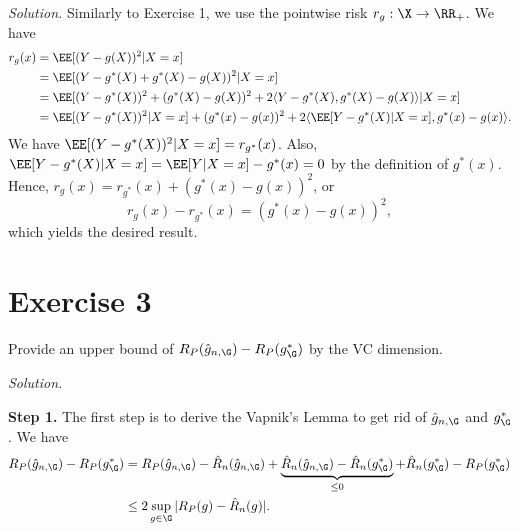 \textit{Solution.} Similarly to Exercise 1, we use the pointwise risk $r_g:\X\to \RR_+$. We have
\begin{align*}
  r_g(x) & = \EE[(Y-g(X))^2 | X=x]                                                                    \\
         & = \EE[(Y-g^*(X)+g^*(X)-g(X))^2 | X=x]                                                      \\
         & = \EE[(Y-g^*(X))^2 + (g^*(X)-g(X))^2 + 2\langle Y-g^*(X),g^*(X)-g(X)\rangle | X=x]         \\
         & = \EE[(Y-g^*(X))^2|X=x] + (g^*(x)-g(x))^2 + 2\langle \EE[Y-g^*(X)|X=x],g^*(x)-g(x)\rangle.
\end{align*}
We have $\EE[(Y-g^*(X))^2|X=x]=r_{g^*}(x)$. Also, $\EE[Y-g^*(X)|X=x]= \EE[Y|X=x] - g^*(x) = 0$ by the definition of $g^*(x)$. Hence, $r_g(x) = r_{g^*}(x) + (g^*(x)-g(x))^2$, or
$$r_g(x) - r_{g^*}(x) = (g^*(x)-g(x))^2,$$
which yields the desired result.

\section{Exercise 3} Provide an upper bound of $R_P(\hat{g}_{n,\G}) - R_P(g^*_{\G})$ by the VC dimension.

\textit{Solution.}

\textbf{Step 1.} The first step is to derive the Vapnik's Lemma to get rid of $\hat{g}_{n,\G}$ and $g^*_{\G}$. We have
\begin{align*}
  R_P(\hat{g}_{n,\G}) - R_P(g^*_{\G})
   & = R_P(\hat{g}_{n,\G}) - \hat{R}_n(\hat{g}_{n,\G}) + \underbrace{\hat{R}_n(\hat{g}_{n,\G}) -  \hat{R}_n(g^*_{\G})}_{\le 0} + \hat{R}_n(g^*_{\G}) - R_P(g^*_{\G}) \\
   & \le 2\sup_{g\in\G}|R_P(g) - \hat{R}_n(g)|.
\end{align*}

